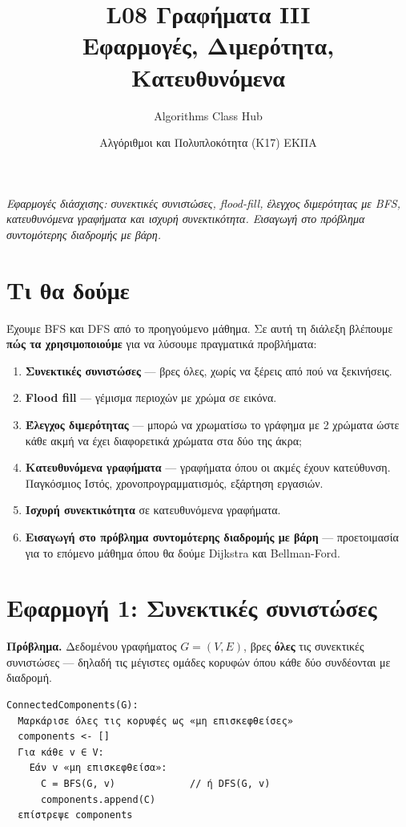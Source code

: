 \documentclass[11pt,a4paper]{article}
\title{\textbf{L08 \textperiodcentered{} Γραφήματα III}\\[2pt]
\large Εφαρμογές, Διμερότητα, Κατευθυνόμενα}
\author{Algorithms Class Hub}
\date{\small Αλγόριθμοι και Πολυπλοκότητα (K17) \textperiodcentered{} ΕΚΠΑ}
\begin{document}
\maketitle

\begin{center}\itshape\small
Εφαρμογές διάσχισης: συνεκτικές συνιστώσες, flood-fill, έλεγχος διμερότητας με
BFS, κατευθυνόμενα γραφήματα και ισχυρή συνεκτικότητα. Εισαγωγή στο πρόβλημα
συντομότερης διαδρομής με βάρη.
\end{center}

\section{Τι θα δούμε}

Έχουμε BFS και DFS από το προηγούμενο μάθημα. Σε αυτή τη διάλεξη βλέπουμε
\textbf{πώς τα χρησιμοποιούμε} για να λύσουμε πραγματικά προβλήματα:
\begin{enumerate}
  \item \textbf{Συνεκτικές συνιστώσες} --- βρες όλες, χωρίς να ξέρεις από πού να
  ξεκινήσεις.
  \item \textbf{Flood fill} --- γέμισμα περιοχών με χρώμα σε εικόνα.
  \item \textbf{Έλεγχος διμερότητας} --- μπορώ να χρωματίσω το γράφημα με 2
  χρώματα ώστε κάθε ακμή να έχει διαφορετικά χρώματα στα δύο της άκρα;
  \item \textbf{Κατευθυνόμενα γραφήματα} --- γραφήματα όπου οι ακμές έχουν
  κατεύθυνση. Παγκόσμιος Ιστός, χρονοπρογραμματισμός, εξάρτηση εργασιών.
  \item \textbf{Ισχυρή συνεκτικότητα} σε κατευθυνόμενα γραφήματα.
  \item \textbf{Εισαγωγή στο πρόβλημα συντομότερης διαδρομής με βάρη} ---
  προετοιμασία για το επόμενο μάθημα όπου θα δούμε Dijkstra και Bellman-Ford.
\end{enumerate}

\section{Εφαρμογή 1: Συνεκτικές συνιστώσες}

\textbf{Πρόβλημα.} Δεδομένου γραφήματος $G = (V, E)$, βρες \textbf{όλες} τις
συνεκτικές συνιστώσες --- δηλαδή τις μέγιστες ομάδες κορυφών όπου κάθε δύο
συνδέονται με διαδρομή.

\begin{codebox}
\begin{verbatim}
ConnectedComponents(G):
  Μαρκάρισε όλες τις κορυφές ως «μη επισκεφθείσες»
  components <- []
  Για κάθε v ∈ V:
    Εάν v «μη επισκεφθείσα»:
      C = BFS(G, v)             // ή DFS(G, v)
      components.append(C)
  επίστρεψε components
\end{verbatim}
\end{codebox}
\end{document}
